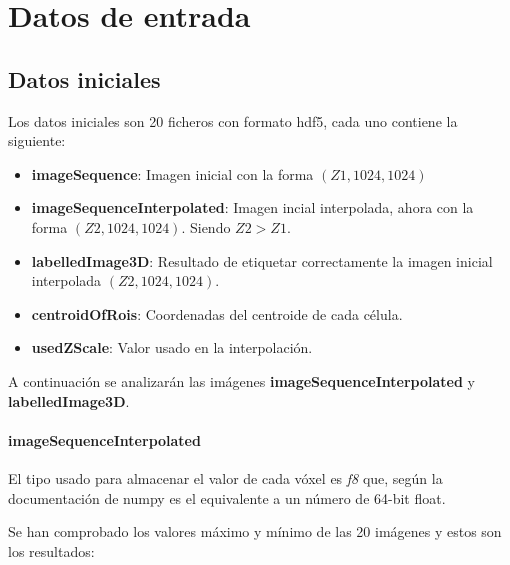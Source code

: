 \chapter{Datos de entrada}\label{requisitos}

\section{Datos iniciales}\label{sub:datos_entrada}

Los datos iniciales son 20 ficheros con formato hdf5, cada uno contiene la siguiente:

\begin{itemize}
\item \textbf{imageSequence}: Imagen inicial con la forma $ (Z1, 1024, 1024) $
\item \textbf{imageSequenceInterpolated}: Imagen incial interpolada, ahora con la forma $ (Z2, 1024, 1024) $. Siendo $ Z2 > Z1 $. 
\item \textbf{labelledImage3D}: Resultado de etiquetar correctamente la imagen inicial interpolada $ (Z2, 1024, 1024) $.
\item \textbf{centroidOfRois}: Coordenadas del centroide de cada célula.
\item \textbf{usedZScale}: Valor usado en la interpolación.
\end{itemize}

A continuación se analizarán las imágenes \textbf{imageSequenceInterpolated} y \textbf{labelledImage3D}.

\subsubsection{imageSequenceInterpolated}

El tipo usado para almacenar el valor de cada vóxel es \textit{f8} que, según la documentación de numpy es el equivalente a un número de 64-bit float.

Se han comprobado los valores máximo y mínimo de las 20 imágenes y estos son los resultados:


